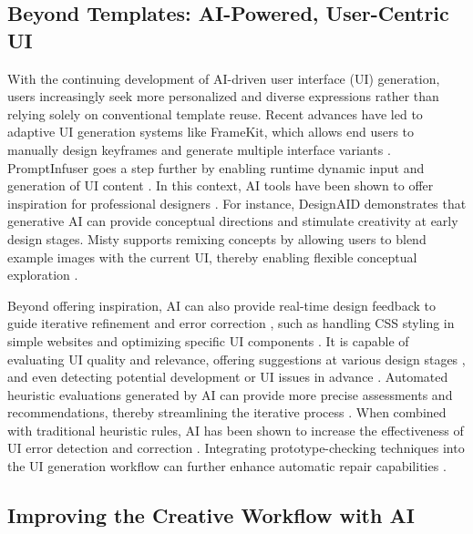 \subsection{Beyond Templates: AI-Powered, User-Centric UI}

With the continuing development of AI-driven user interface (UI) generation, users increasingly seek more personalized and diverse expressions rather than relying solely on conventional template reuse. Recent advances have led to adaptive UI generation systems like FrameKit, which allows end users to manually design keyframes and generate multiple interface variants \cite{wu_framekit_2024}. PromptInfuser goes a step further by enabling runtime dynamic input and generation of UI content \cite{petridisPromptInfuserHowTightly2024}. In this context, AI tools have been shown to offer inspiration for professional designers \cite{luBridgingGapUX2022}. For instance, DesignAID \cite{cai_designaid_2023} demonstrates that generative AI can provide conceptual directions and stimulate creativity at early design stages. Misty supports remixing concepts by allowing users to blend example images with the current UI, thereby enabling flexible conceptual exploration \cite{luMistyUIPrototyping2024}.

Beyond offering inspiration, AI can also provide real-time design feedback to guide iterative refinement and error correction \cite{duan_towards_2023}, such as handling CSS styling in simple websites and optimizing specific UI components \cite{liUsingLLMsCustomize2023}. It is capable of evaluating UI quality and relevance, offering suggestions at various design stages \cite{wuUIClipDatadrivenModel2024}, and even detecting potential development or UI issues in advance \cite{petridisPromptInfuserHowTightly2024}. Automated heuristic evaluations generated by AI can provide more precise assessments and recommendations, thereby streamlining the iterative process \cite{duanGeneratingAutomaticFeedback2024}. When combined with traditional heuristic rules, AI has been shown to increase the effectiveness of UI error detection and correction \cite{lu_ai_2024}. Integrating prototype-checking techniques into the UI generation workflow can further enhance automatic repair capabilities \cite{xiaoPrototype2CodeEndtoendFrontend2024}.

\subsection{Improving the Creative Workflow with AI}

